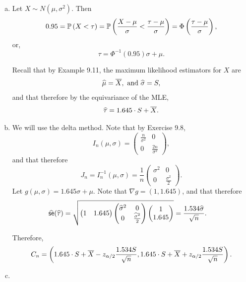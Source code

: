 \begin{ex}~
  \begin{enumerate}[(a)]
    \item Let $X\sim N(\mu,\sigma^2)$. Then
          \[
            0.95
            =\P{X<\tau}
            =\P{\frac{X-\mu}{\sigma}<\frac{\tau-\mu}{\sigma}}
            =\Phi\left(\frac{\tau-\mu}{\sigma} \right),
          \]
          or,
          \[
            \tau=\Phi^{-1}(0.95)\sigma+\mu.
          \]

          Recall that by Example 9.11, the maximum likelihood estimators for $X$
          are
          \[
            \muhat = \Xbar,\text{ and }
            \sigmahat = S,
          \]
          and that therefore by the equivariance of the MLE,
          \[
            \widehat{\tau}=1.645\cdot S+\Xbar.
          \]
    \item We will use the delta method. Note that by Exercise 9.8,
          \[
            I_n(\mu,\sigma)
            =\begin{pmatrix}
              \frac{n}{\sigma^2} & 0                   \\
              0                  & \frac{2n}{\sigma^2}
            \end{pmatrix},
          \]
          and that therefore
          \[
            J_n=I^{-1}_n(\mu,\sigma)
            =\frac{1}{n}\begin{pmatrix}
              \sigma^2 & 0                  \\
              0        & \frac{\sigma^2}{2}
            \end{pmatrix}.
          \]
          Let $g(\mu,\sigma)=1.645 \sigma+\mu$. Note that
          $\nabla g=(1, 1.645)$, and that therefore
          \begin{align*}
            \widehat{\textsf{se}}(\widehat{\tau})
             & =\sqrt{\begin{pmatrix}
                1 & 1.645 \\
              \end{pmatrix}
              \begin{pmatrix}
                \sigmahat^2 & 0                     \\
                0           & \frac{\sigmahat^2}{2}
              \end{pmatrix}
              \begin{pmatrix}
                1 \\ 1.645
              \end{pmatrix}}
            =\frac{1.534\sigmahat}{\sqrt{n}}.
          \end{align*}

          Therefore,
          \[
            C_n=\left(
            1.645\cdot S+\Xbar-z_{\alpha/2}\frac{1.534 S}{\sqrt{n}},
            1.645\cdot S+\Xbar+z_{\alpha/2}\frac{1.534 S}{\sqrt{n}}
            \right).
          \]
    \item~
          \inputminted{python}{../code/09-03.py}
          \inputminted{text}{../output/09-03.txt}
  \end{enumerate}
\end{ex}

